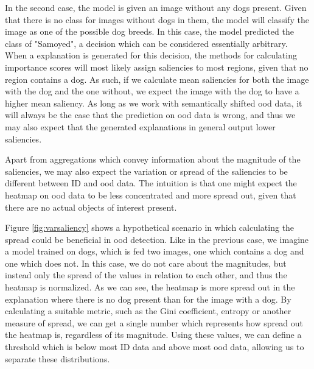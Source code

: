 \documentclass[UKenglish]{uiomasterthesis} %
\theoremstyle{definition}
\begin{document}
In the second case, the model is given an image without any dogs present. Given that there is no class for images without dogs in them, the model will classify the image as one of the possible dog breeds. In this case, the model predicted the class of "Samoyed", a decision which can be considered essentially arbitrary. When a explanation is generated for this decision, the methods for calculating importance scores will most likely assign saliencies to most regions, given that no region contains a dog. As such, if we calculate mean saliencies for both the image with the dog and the one without, we expect the image with the dog to have a higher mean saliency. As long as we work with semantically shifted \ac{ood} data, it will always be the case that the prediction on \ac{ood} data is wrong, and thus we may also expect that the generated explanations in general output lower saliencies.

Apart from aggregations which convey information about the magnitude of the saliencies, we may also expect the variation or spread of the saliencies to be different between ID and \ac{ood} data. The intuition is that one might expect the heatmap on \ac{ood} data to be less concentrated and more spread out, given that there are no actual objects of interest present.

Figure \ref{fig:varsaliency} shows a hypothetical scenario in which calculating the spread could be beneficial in \ac{ood} detection. Like in the previous case, we imagine a model trained on dogs, which is fed two images, one which contains a dog and one which does not. In this case, we do not care about the magnitudes, but instead only the spread of the values in relation to each other, and thus the heatmap is normalized. As we can see, the heatmap is more spread out in the explanation where there is no dog present than for the image with a dog. By calculating a suitable metric, such as the Gini coefficient, entropy or another measure of spread, we can get a single number which represents how spread out the heatmap is, regardless of its magnitude. Using these values, we can define a threshold which is below most ID data and above most \ac{ood} data, allowing us to separate these distributions.
\end{document}
